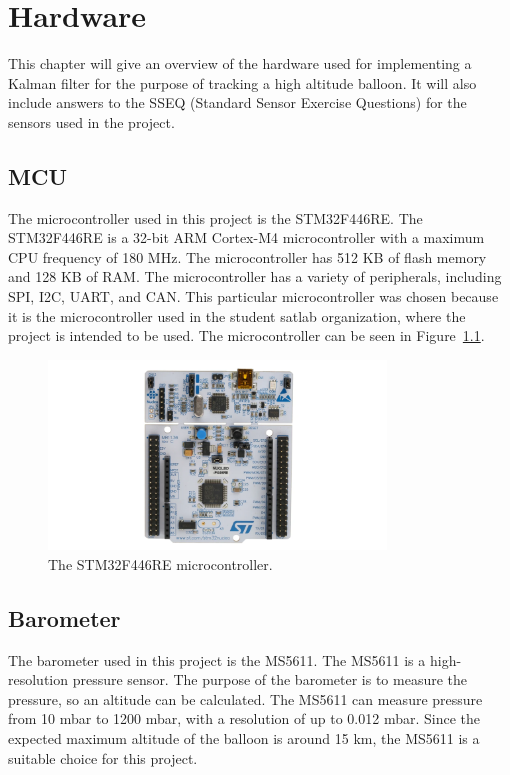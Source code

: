 \chapter{Hardware}\label{ch:hardware}
This chapter will give an overview of the hardware used for implementing a Kalman filter for the purpose of tracking a high altitude balloon.
It will also include answers to the SSEQ (Standard Sensor Exercise Questions) for the sensors used in the project.


\section{MCU}\label{sec:mcu}
The microcontroller used in this project is the STM32F446RE. The STM32F446RE is a 32-bit ARM Cortex-M4 microcontroller with a maximum CPU frequency of 180 MHz.
The microcontroller has 512 KB of flash memory and 128 KB of RAM.
The microcontroller has a variety of peripherals, including SPI, I2C, UART, and CAN.
This particular microcontroller was chosen because it is the microcontroller used in the student satlab organization, where the project is intended to be used.
The microcontroller can be seen in Figure~\ref{fig:stm32f446re}.
\begin{figure}[H]
    \centering
    \includegraphics[width=0.8\textwidth]{chapters/02Harware/figures/stm32}
    \caption{The STM32F446RE microcontroller.}
    \label{fig:stm32f446re}
\end{figure}


\section{Barometer}\label{sec:barometer}
The barometer used in this project is the MS5611.
The MS5611 is a high-resolution pressure sensor. The purpose of the barometer is to measure the pressure, so an altitude can be calculated.
The MS5611 can measure pressure from 10 mbar to 1200 mbar, with a resolution of up to 0.012 mbar. %
Since the expected maximum altitude of the balloon is around 15 km, the MS5611 is a suitable choice for this project.


